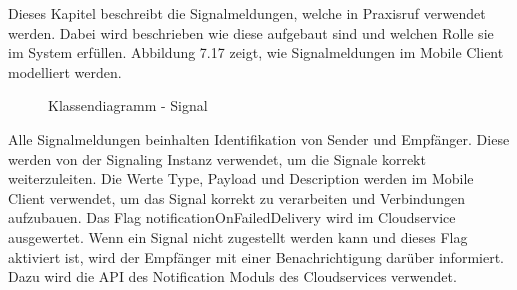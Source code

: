 Dieses Kapitel beschreibt die Signalmeldungen, welche in Praxisruf verwendet werden.
Dabei wird beschrieben wie diese aufgebaut sind und welchen Rolle sie im System erfüllen.
Abbildung 7.17 zeigt, wie Signalmeldungen im Mobile Client modelliert werden.

\begin{figure}[h]
    \centering
    \begin{minipage}[b]{0.5\textwidth}
        \caption{Klassendiagramm - Signal}
    \end{minipage}
\end{figure}

Alle Signalmeldungen beinhalten Identifikation von Sender und Empfänger.
Diese werden von der Signaling Instanz verwendet, um die Signale korrekt weiterzuleiten.
Die Werte Type, Payload und Description werden im Mobile Client verwendet, um das Signal korrekt zu verarbeiten und Verbindungen aufzubauen.
Das Flag notificationOnFailedDelivery wird im Cloudservice ausgewertet.
Wenn ein Signal nicht zugestellt werden kann und dieses Flag aktiviert ist, wird der Empfänger mit einer Benachrichtigung darüber informiert.
Dazu wird die API des Notification Moduls des Cloudservices verwendet.

